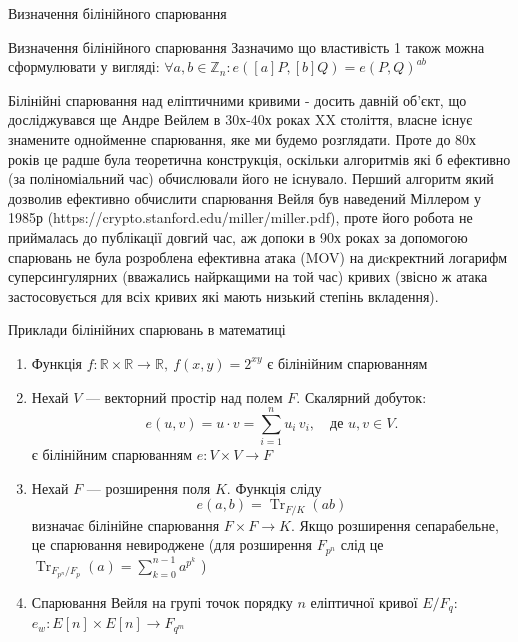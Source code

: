 \documentclass[9pt]{beamer}
\begin{document}
\begin{darkframes}
\begin{frame}{Визначення білінійного спарювання}
\end{frame}

\begin{frame}{Визначення білінійного спарювання}
  Зазначимо що властивість 1 також можна сформулювати у вигляді: $\forall a,b \in \mathbb{Z}_n: e([a]P, [b]Q) = e(P,Q)^{ab}$

  Білінійні спарювання над еліптичними кривими - досить давній об'єкт, що досліджувався ще Андре Вейлем в 30х-40х роках XX століття, власне існує знамените однойменне спарювання, яке ми будемо розглядати. Проте до 80х років це радше була теоретична конструкція, оскільки алгоритмів які б ефективно (за поліноміальний час) обчислювали його не існувало. Перший алгоритм який дозволив ефективно обчислити спарювання Вейля був наведений Міллером у 1985р (https://crypto.stanford.edu/miller/miller.pdf), проте його робота не приймалась до публікації довгий час, аж допоки в 90х роках за допомогою спарювань не була розроблена ефективна атака (MOV) на диcкректний логарифм суперсингулярних (вважались найркащими на той час) кривих (звісно ж атака застосовується для всіх кривих які мають низький степінь вкладення).
\end{frame}
\begin{frame}{Приклади білінійних спарювань в математиці}
  \begin{enumerate}
    \item Функція $f:\mathbb{R} \times \mathbb{R} \to \mathbb{R},\ f(x, y) = 2^{xy}$ є білінійним спарюванням
      \item Нехай \(V\) — векторний простір над полем \(F\). Скалярний добуток:
  \[
  e(u,v)=u\cdot v=\sum_{i=1}^{n} u_i\,v_i,\quad \text{де } u,v\in V.
  \]
  є білінійним спарюванням $e: V \times V \to F$
  \item Нехай \(F\) — розширення поля \(K\). Функція сліду
  \[
  e(a,b)=\operatorname{Tr}_{F/K}(ab)
  \]
  визначає білінійне спарювання \(F \times F \to K\). Якщо розширення сепарабельне, це спарювання невироджене (для розширення $F_{p^n}$ слід це $\operatorname{Tr}_{F_{p^n}/F_p}(a) = \sum_{k=0}^{n-1} a^{p^k}$ )
  \item Спарювання Вейля на групі точок порядку $n$ еліптичної кривої $E/F_q$: $e_w:E[n] \times E[n] \to F_{q^m}$
  \end{enumerate}

\end{frame}


\end{darkframes}
\end{document}

